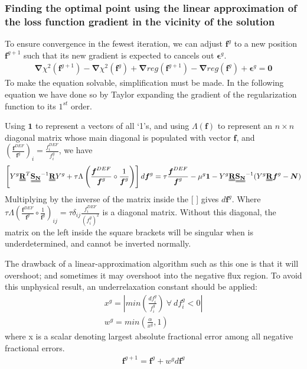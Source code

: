 \documentclass[a4paper, 12pt]{article}
\newcommand{\matr}[1]{\uuline{\bf{#1}}}
\newcommand{\ve}[1]{\boldsymbol{#1}}
\newcommand{\covarN}{\matr{S_N}^{-1}}
\newcommand{\RSR}{\matr{R}^T\covarN\matr{R}}
\begin{document}
\subsubsection{Finding the optimal point using the linear approximation of the loss function gradient in the vicinity of the solution}\label{inverse iterative}
To ensure convergence in the fewest iteration, we can adjust $\ve{f}^g$ to a new position $\ve{f}^{g+1}$ such that its new gradient is expected to cancels out $\ve{\epsilon}^g$.
\begin{align*}
    \ve{\nabla}\chi^2(\ve{f}^{g+1}) - \ve{\nabla}\chi^2(\ve{f}^g) + \ve{\nabla}reg(\ve{f}^{g+1})-\ve{\nabla}reg(\ve{f}^{g}) + \ve{\epsilon}^g = \ve{0}
\end{align*}
To make the equation solvable, simplification must be made. In the following equation we have done so by Taylor expanding the gradient of the regularization function to its $1^{st}$ order.

Using $\ve{1}$ to represent a vectors of all `1's, and using $\Lambda(\ve{f})$ to represent an $n\times n$ diagonal matrix whose main diagonal is populated with vector $\ve{f}$, and $(\frac{\ve{f}^{DEF}}{\ve{f}^g})_i = \frac{f^{DEF}_i}{f^g_i}$, we have
\begin{align}
    \left[Y^g\RSR Y^g+\tau\Lambda\left(\frac{\ve{f}^{DEF}}{\ve{f}^g}\circ\frac{1}{\ve{f}^g}\right)\right] d\ve{f}^g = \tau\frac{\ve{f}^{DEF}}{\ve{f}^g} - \mu^g\ve{1} - Y^g \matr{R}\covarN (Y^g\matr{R}\ve{f}^g-\ve{N})
\end{align}
Multiplying by the inverse of the matrix inside the [ ] gives $d\ve{f}^g$. Where $\tau\Lambda\left(\frac{\ve{f}^{DEF}}{\ve{f}^g}\circ\frac{1}{\ve{f}^g}\right)_{ij} = \tau \delta_{ij}\frac{f^{DEF}_i}{(f^g_i)^2}$ is a diagonal matrix. Without this diagonal, the matrix on the left inside the square brackets will be singular when \matr{R} is underdetermined, and cannot be inverted normally.

The drawback of a linear-approximation algorithm such as this one is that it will overshoot; and sometimes it may overshoot into the negative flux region. To avoid this unphysical result, an underrelaxation constant should be applied:
\begin{align}
    x^g = |min(\frac{df^g_i}{f^g_i})\:\forall\:df^g_i<0|\\
    w^g = min( \frac{\alpha}{x^g} , 1)
\end{align}
where x is a scalar denoting largest absolute fractional error among all negative fractional errors.
\begin{align*}
    \ve{f}^{g+1}= \ve{f}^g + w^g d\ve{f}^g
\end{align*}
\end{document}
